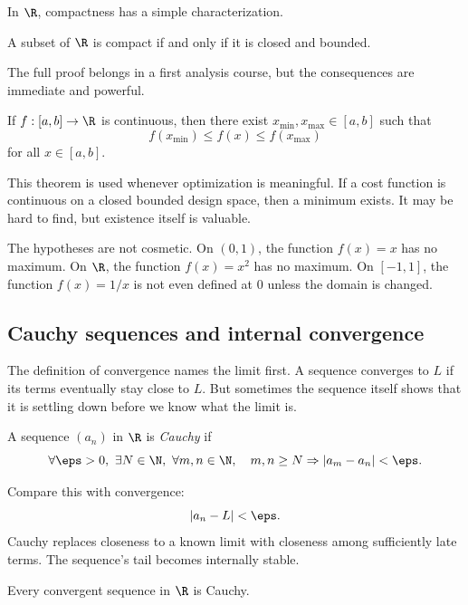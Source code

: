 In $\R$, compactness has a simple characterization.

\begin{theorem}
A subset of $\R$ is compact if and only if it is closed and bounded.
\end{theorem}

The full proof belongs in a first analysis course, but the consequences are
immediate and powerful.

\begin{theorem}
If $f:[a,b]\to\R$ is continuous, then there exist $x_{\min},x_{\max}\in[a,b]$
such that
\[
f(x_{\min})\leq f(x)\leq f(x_{\max})
\]
for all $x\in[a,b]$.
\end{theorem}

This theorem is used whenever optimization is meaningful. If a cost function is
continuous on a closed bounded design space, then a minimum exists. It may be
hard to find, but existence itself is valuable.

\begin{trapbox}
The hypotheses are not cosmetic. On $(0,1)$, the function $f(x)=x$ has no
maximum. On $\R$, the function $f(x)=x^2$ has no maximum. On $[-1,1]$, the
function $f(x)=1/x$ is not even defined at $0$ unless the domain is changed.
\end{trapbox}

\subsection{Cauchy sequences and internal convergence}

The definition of convergence names the limit first. A sequence converges to
$L$ if its terms eventually stay close to $L$. But sometimes the sequence itself
shows that it is settling down before we know what the limit is.

\begin{definition}
A sequence $(a_n)$ in $\R$ is \emph{Cauchy} if
\[
\forall \eps>0,\ \exists N\in\N,\ \forall m,n\in\N,\quad
m,n\geq N\Rightarrow |a_m-a_n|<\eps.
\]
\end{definition}

Compare this with convergence:
\[
|a_n-L|<\eps.
\]
Cauchy replaces closeness to a known limit with closeness among sufficiently
late terms. The sequence's tail becomes internally stable.

\begin{theorem}
Every convergent sequence in $\R$ is Cauchy.
\end{theorem}

